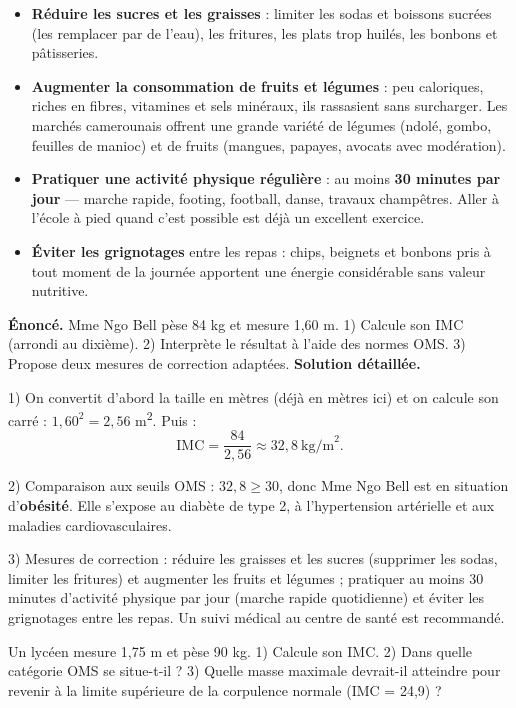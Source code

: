 \documentclass[11pt]{article}
\begin{document}
\begin{itemize}
\item \textbf{Réduire les sucres et les graisses} : limiter les sodas et boissons sucrées (les remplacer par de l'eau), les fritures, les plats trop huilés, les bonbons et pâtisseries.
\item \textbf{Augmenter la consommation de fruits et légumes} : peu caloriques, riches en fibres, vitamines et sels minéraux, ils rassasient sans surcharger. Les marchés camerounais offrent une grande variété de légumes (ndolé, gombo, feuilles de manioc) et de fruits (mangues, papayes, avocats avec modération).
\item \textbf{Pratiquer une activité physique régulière} : au moins \textbf{30 minutes par jour} — marche rapide, footing, football, danse, travaux champêtres. Aller à l'école à pied quand c'est possible est déjà un excellent exercice.
\item \textbf{Éviter les grignotages} entre les repas : chips, beignets et bonbons pris à tout moment de la journée apportent une énergie considérable sans valeur nutritive.
\end{itemize}

\begin{exoresolu}
\textbf{Énoncé.} Mme Ngo Bell pèse 84 kg et mesure 1,60 m. 1) Calcule son IMC (arrondi au dixième). 2) Interprète le résultat à l'aide des normes OMS. 3) Propose deux mesures de correction adaptées.
\tcblower
\textbf{Solution détaillée.}

1) On convertit d'abord la taille en mètres (déjà en mètres ici) et on calcule son carré : $1{,}60^2 = 2{,}56$ m\textsuperscript{2}. Puis :
\[ \mathrm{IMC} = \frac{84}{2{,}56} \approx 32{,}8\ \text{kg/m}^2. \]

2) Comparaison aux seuils OMS : $32{,}8 \geq 30$, donc Mme Ngo Bell est en situation d'\textbf{obésité}. Elle s'expose au diabète de type 2, à l'hypertension artérielle et aux maladies cardiovasculaires.

3) Mesures de correction : réduire les graisses et les sucres (supprimer les sodas, limiter les fritures) et augmenter les fruits et légumes ; pratiquer au moins 30 minutes d'activité physique par jour (marche rapide quotidienne) et éviter les grignotages entre les repas. Un suivi médical au centre de santé est recommandé.
\end{exoresolu}

\begin{exercice}
Un lycéen mesure 1,75 m et pèse 90 kg. 1) Calcule son IMC. 2) Dans quelle catégorie OMS se situe-t-il ? 3) Quelle masse maximale devrait-il atteindre pour revenir à la limite supérieure de la corpulence normale (IMC = 24,9) ?
\end{exercice}
\end{document}
